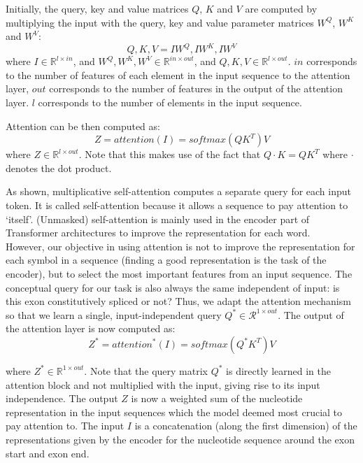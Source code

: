 Initially, the query, key and value matrices $Q$, $K$ and $V$ are computed by multiplying the input with the query, key and value parameter matrices $W^Q$, $W^K$ and $W^V$:
$$Q, K, V = IW^Q, IW^K, IW^V$$
where $I \in \mathbb{R}^{l \times in}$, and $W^Q,W^K, W^V \in \mathbb{R}^{in \times out}$,
and $Q,K, V \in \mathbb{R}^{l \times out}$. $in$ corresponds to the number of features of each element in the input sequence to the attention layer, $out$ corresponds to the number of features in the output of the attention layer. $l$ corresponds to the number of elements in the input sequence.

Attention can be then computed as:
$$Z = attention(I) = softmax(QK^T)V$$
where $Z \in \mathbb{R}^{l \times out}$. 
Note that this makes use of the fact that $Q\cdotp K = QK^T$ where $\cdotp$ denotes the dot product.


As shown, multiplicative self-attention computes a separate query for each input token. It is called self-attention because it allows a sequence to pay attention to `itself'. (Unmasked) self-attention is mainly used in the encoder part of Transformer architectures to improve the representation for each word.\\
However, our objective in using attention is not to improve the representation for each symbol in a sequence (finding a good representation is the task of the encoder), but to select the most important features from an input sequence. The conceptual query for our task is also always the same independent of input: is this exon constitutively spliced or not?
Thus, we adapt the attention mechanism so that we learn a single, input-independent query ${Q}^* \in \mathcal{R}^{1 \times out}$. The output of the attention layer is now computed as:
$$Z^* = {attention}^*(I) = softmax({Q}^*K^T)V$$


where $Z^* \in \mathbb{R}^{1 \times out}$. Note that the query matrix ${Q}^*$ is directly learned in the attention block and not multiplied with the input, giving rise to its input independence. The output $Z$ is now a weighted sum of the nucleotide representation in the input sequences which the model deemed most crucial to pay attention to.
The input $I$ is a concatenation (along the first dimension) of the representations given by the encoder for the nucleotide sequence around the exon start and exon end.



